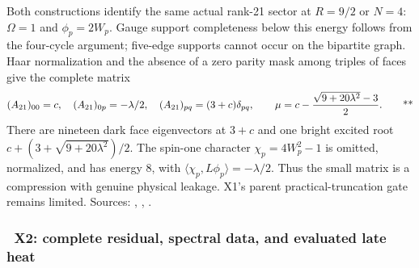 Both constructions identify the same actual rank-21 sector at $R=9/2$ or
$N=4$: $\Omega=1$ and $\phi_p=2W_p$.  Gauge support completeness below this
energy follows from the four-cycle argument; five-edge supports cannot occur
on the bipartite graph.  Haar normalization and the absence of a zero parity
mask among triples of faces give the complete matrix
\begin{equation}
 (A_{21})_{00}=c,\quad (A_{21})_{0p}=-\lambda/2,\quad
 (A_{21})_{pq}=(3+c)\delta_{pq},\qquad
 \mu=c-\frac{\sqrt{9+20\lambda^2}-3}{2}.\qquad\text{**}
 \label{recent:matrix21}
\end{equation}
There are nineteen dark face eigenvectors at $3+c$ and one bright excited
root $c+(3+\sqrt{9+20\lambda^2})/2$.  The spin-one character
$\chi_p=4W_p^2-1$ is omitted, normalized, and has energy 8, with
$\langle\chi_p,L\phi_p\rangle=-\lambda/2$.  Thus the small matrix is a
compression with genuine physical leakage.  X1's parent practical-truncation
gate remains limited.  Sources: ,
,
.

\subsubsection{\workstar\ X2: complete residual, spectral data, and evaluated late heat}


